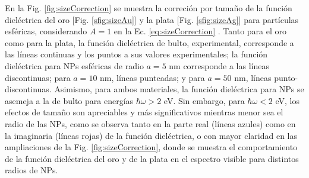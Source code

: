 %
%
%	
%	

En la Fig.  \ref{fig:sizeCorrection} se muestra la correción por tamaño de la función dieléctrica del oro [Fig. \ref{sfig:sizeAu}] y la plata [Fig.  \ref{sfig:sizeAg}] para partículas esféricas, considerando $A=1$ en la Ec. \eqref{eq:sizeCorrection} \cite{noguez2007surface}. Tanto para el oro como para la plata, la función dieléctrica de bulto, experimental, corresponde a las líneas continuas y los puntos a sus valores experimentales; la función dieléctrica para NPs esféricas de radio $a=5$ nm corresponde a las líneas discontinuas; para $a=10$ nm, líneas punteadas; y para $a=50$ nm, líneas punto-discontinuas. Asimismo, para ambos materiales, la función dieléctrica para NPs se asemeja a la de bulto para energías $\hbar\omega>2$ eV. Sin embargo, para $\hbar\omega<2$ eV, los efectos de tamaño son apreciables y más significativos mientras menor sea el radio de las NPs, como se observa tanto  en la parte real (líneas azules) como en la imaginaria (líneas rojas) de la función dieléctrica, o con mayor claridad en las ampliaciones de la Fig. \ref{fig:sizeCorrection}, donde se muestra el comportamiento de la función dieléctrica del oro y de la plata en el espectro visible para distintos radios de NPs.

